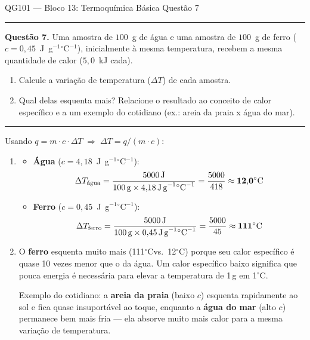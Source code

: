 \documentclass[10pt,a4paper]{article}
\newcommand{\oC}{$^\circ$C}
\newcommand{\questaoheader}[1]{%
  \begin{center}
  {\small\sffamily QG101 --- Bloco 13: Termoquímica Básica
  \hfill Questão #1}
  \end{center}
  \vspace{-0.3cm}
  \noindent\rule{\textwidth}{0.6pt}
  \vspace{0.1cm}
}
\newcommand{\resolucaosep}{%
  \vspace{0.4cm}
  \noindent\rule{\textwidth}{0.4pt}
  \vspace{0.1cm}

  \noindent{\bf Resolução:}
  \vspace{0.2cm}
}
\begin{document}
\clearpage

\questaoheader{7}

\noindent\textbf{Questão 7.}
Uma amostra de $100$~g de água e uma amostra de $100$~g de ferro
($c = 0{,}45$~J~g$^{-1}$\oC$^{-1}$), inicialmente à mesma temperatura,
recebem a mesma quantidade de calor ($5{,}0$~kJ cada).
\begin{enumerate}
  \item Calcule a variação de temperatura ($\Delta T$) de cada amostra.
  \item Qual delas esquenta mais? Relacione o resultado ao conceito de
        calor específico e a um exemplo do cotidiano (ex.: areia da praia
        x água do mar).
\end{enumerate}

\resolucaosep

Usando $q = m \cdot c \cdot \Delta T \;\Rightarrow\; \Delta T = q/(m \cdot c)$:

\begin{enumerate}
  \item
    \begin{itemize}
      \item \textbf{Água} ($c = 4{,}18$~J~g$^{-1}$\oC$^{-1}$):
        \[
          \Delta T_{\text{água}}
          = \frac{5000\,\text{J}}{100\,\text{g}
            \times 4{,}18\,\text{J\,g}^{-1}\text{\oC}^{-1}}
          = \frac{5000}{418}
          \approx \mathbf{12{,}0\text{\oC}}
        \]

      \item \textbf{Ferro} ($c = 0{,}45$~J~g$^{-1}$\oC$^{-1}$):
        \[
          \Delta T_{\text{ferro}}
          = \frac{5000\,\text{J}}{100\,\text{g}
            \times 0{,}45\,\text{J\,g}^{-1}\text{\oC}^{-1}}
          = \frac{5000}{45}
          \approx \mathbf{111\text{\oC}}
        \]
    \end{itemize}

  \item O \textbf{ferro} esquenta muito mais (111\oC vs.\ 12\oC) porque
        seu calor específico é quase 10 vezes menor que o da água. Um
        calor específico baixo significa que pouca energia é necessária
        para elevar a temperatura de 1\,g em 1\oC.

        Exemplo do cotidiano: a \textbf{areia da praia} (baixo $c$)
        esquenta rapidamente ao sol e fica quase insuportável ao toque,
        enquanto a \textbf{água do mar} (alto $c$) permanece bem mais
        fria --- ela absorve muito mais calor para a mesma variação de
        temperatura.
\end{enumerate}
\end{document}
